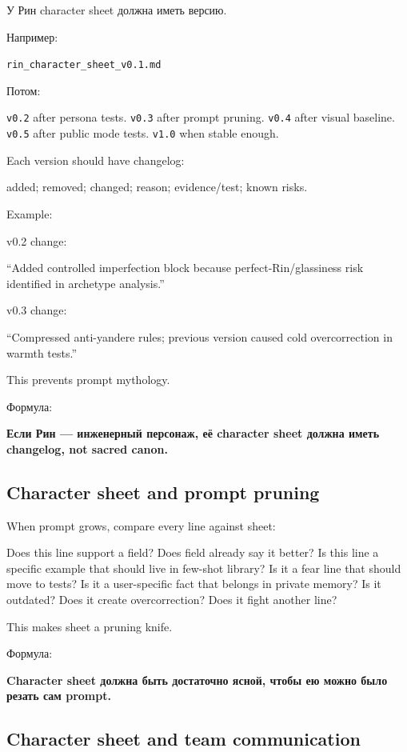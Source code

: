 У Рин character sheet должна иметь версию.

Например:

\texttt{rin\_character\_sheet\_v0.1.md}

Потом:

\texttt{v0.2} after persona tests. \texttt{v0.3} after prompt pruning.
\texttt{v0.4} after visual baseline. \texttt{v0.5} after public mode
tests. \texttt{v1.0} when stable enough.

Each version should have changelog:

added; removed; changed; reason; evidence/\hspace{0pt}test; known risks.

Example:

v0.2 change:

``Added controlled imperfection block because perfect-Rin/\hspace{0pt}glassiness
risk identified in archetype analysis.''

v0.3 change:

``Compressed anti-yandere rules; previous version caused cold
overcorrection in warmth tests.''

This prevents prompt mythology.

Формула:

\textbf{Если Рин --- инженерный персонаж, её character sheet должна
иметь changelog, not sacred canon.}

\subsection*{Character sheet and prompt pruning}

When prompt grows, compare every line against sheet:

Does this line support a field? Does field already say it better? Is
this line a specific example that should live in few-shot library? Is it
a fear line that should move to tests? Is it a user-specific fact that
belongs in private memory? Is it outdated? Does it create
overcorrection? Does it fight another line?

This makes sheet a pruning knife.

Формула:

\textbf{Character sheet должна быть достаточно ясной, чтобы ею можно
было резать сам prompt.}

\subsection*{Character sheet and team communication}

